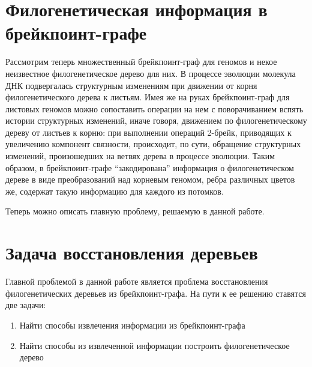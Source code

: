 \section{Филогенетическая информация в брейкпоинт-графе}

Рассмотрим теперь множественный брейкпоинт-граф для геномов и некое неизвестное филогенетическое дерево для них.
В процессе эволюции молекула ДНК подвергалась структурным изменениям при движении от корня филогенетического дерева к листьям.
Имея же на руках брейкпоинт-граф для листовых геномов можно сопоставить операции на нем с поворачиванием вспять истории структурных изменений,
иначе говоря, движением по филогенетическому дереву от листьев к корню:
при выполнении операций 2-брейк, приводящих к увеличению компонент связности, происходит, по сути, обращение структурных изменений,
произошедших на ветвях дерева в процессе эволюции.
Таким образом, в брейкпоинт-графе ``закодирована'' информация о филогенетическом дереве в виде преобразований над корневым геномом,
ребра различных цветов же, содержат такую информацию для каждого из потомков.

Теперь можно описать главную проблему, решаемую в данной работе.

\section{Задача восстановления деревьев}
Главной проблемой в данной работе является проблема восстановления филогенетических деревьев из брейкпоинт-графа.
На пути к ее решению ставятся две задачи:
\begin{enumerate}
  \item Найти способы извлечения информации из брейкпоинт-графа
  \item Найти способы из извлеченной информации построить филогенетическое дерево
\end{enumerate}
